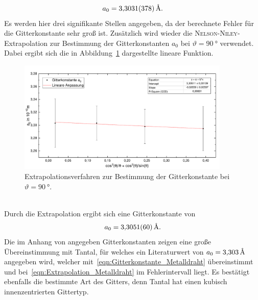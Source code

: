 \documentclass[a4paper,twoside,final]{article}
\begin{document}
\begin{align}
  a_0 = \SI{3,3031 \pm0,0378}{\textup{\AA}}.\label{eqn:Gitterkonstante_Metalldraht}
\end{align}
Es werden hier drei signifikante Stellen angegeben, da der berechnete Fehler für die Gitterkonstante sehr groß ist.
Zusätzlich wird wieder die \textsc{Nelson-Niley}-Extrapolation zur Bestimmung der Gitterkonstanten $a_0$ bei $\vartheta = \SI{90}{\degree}$ verwendet. Dabei ergibt sich die in Abbildung~\ref{fig:Extrapolation_Metalldraht} dargestellte lineare Funktion.
\begin{figure}[htp]
    \centering
        \includegraphics[width=0.9\textwidth]{Abbildungen/Extrapolation_Metalldraht.pdf}
    \caption{Extrapolationsverfahren zur Bestimmung der Gitterkonstante bei $\vartheta = \SI{90}{\degree}$.}
    \label{fig:Extrapolation_Metalldraht}
\end{figure}\\
Durch die Extrapolation ergibt sich eine Gitterkonstante von
\begin{align}
  a_0 =  \SI{3,3051 \pm 0,0060}{\textup{\AA}}.\label{eqn:Extrapolation_Metalldraht}
\end{align}
Die im Anhang von \cite{Uschmann} angegeben Gitterkonstanten zeigen eine große Übereinstimmung mit Tantal, für welches ein Literaturwert von $a_0 = \SI{3,303}{\textup{\AA}}$ angegeben wird, welcher mit~\eqref{eqn:Gitterkonstante_Metalldraht} übereinstimmt und bei~\eqref{eqn:Extrapolation_Metalldraht} im Fehlerintervall liegt. Es bestätigt ebenfalls die bestimmte Art des Gitters, denn Tantal hat einen kubisch innenzentrierten Gittertyp.
\end{document}
